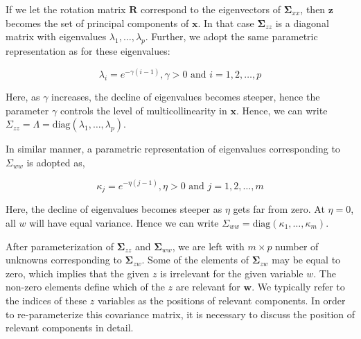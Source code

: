 \documentclass[review]{elsarticle}
\providecommand{\tightlist}{%
  \setlength{\itemsep}{0pt}\setlength{\parskip}{0pt}}
\theoremstyle{definition}
\theoremstyle{definition}
\theoremstyle{definition}
\theoremstyle{remark}
\begin{document}
\begin{description}
\tightlist
\item[\textbf{Parameterization of \(\boldsymbol{\Sigma}_{zz}\)}]
If we let the rotation matrix \(\mathbf{R}\) correspond to the
eigenvectors of \(\boldsymbol{\Sigma}_{xx}\), then \(\mathbf{z}\)
becomes the set of principal components of \(\mathbf{x}\). In that case
\(\boldsymbol{\Sigma}_{zz}\) is a diagonal matrix with eigenvalues
\(\lambda_1, \ldots, \lambda_p\). Further, we adopt the same parametric
representation as \citet{saebo2015simrel} for these eigenvalues:

\begin{equation}
  \lambda_i = e^{-\gamma(i - 1)}, \gamma >0 \text{ and } i = 1, 2, \ldots, p
  \label{eq:gamma-parameter}
  \end{equation}

Here, as \(\gamma\) increases, the decline of eigenvalues becomes
steeper, hence the parameter \(\gamma\) controls the level of
multicollinearity in \(\mathbf{x}\). Hence, we can write
\(\Sigma_{zz} = \Lambda = \text{diag}(\lambda_1, \ldots, \lambda_p)\).
\item[\textbf{Parameterization of \(\boldsymbol{\Sigma}_{ww}\)}]
In similar manner, a parametric representation of eigenvalues
corresponding to \(\Sigma_{ww}\) is adopted as,

\begin{equation}
  \kappa_j = e^{-\eta(j - 1)}, \eta >0 \text{ and } j = 1, 2, \ldots, m
  \label{eq:eta-parameter}
  \end{equation}

Here, the decline of eigenvalues becomes steeper as \(\eta\) gets far
from zero. At \(\eta = 0\), all \(w\) will have equal variance. Hence we
can write \(\Sigma_{ww} = \text{diag}(\kappa_1, \ldots, \kappa_m)\).
\item[\textbf{Parameterization of \(\boldsymbol{\Sigma}_{zw}\)}]
After parameterization of \(\boldsymbol{\Sigma}_{zz}\) and
\(\boldsymbol{\Sigma}_{ww}\), we are left with \(m \times p\) number of
unknowns corresponding to \(\boldsymbol{\Sigma}_{zw}\). Some of the
elements of \(\boldsymbol{\Sigma}_{zw}\) may be equal to zero, which
implies that the given \(z\) is irrelevant for the given variable \(w\).
The non-zero elements define which of the \(z\) are relevant for
\(\mathbf{w}\). We typically refer to the indices of these \(z\)
variables as the positions of relevant components. In order to
re-parameterize this covariance matrix, it is necessary to discuss the
position of relevant components in detail.
\end{description}
\end{document}
